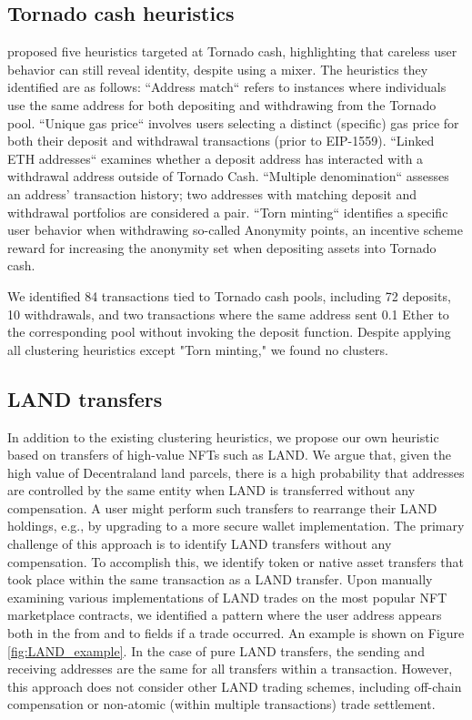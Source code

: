 \documentclass[12pt,a4paper,titlepage,oneside,english]{article}
\begin{document}
\subsection{Tornado cash heuristics}

\cite{wu2022tutela} proposed five heuristics targeted at Tornado cash, highlighting that careless user behavior can still reveal identity, despite using a mixer. The heuristics they identified are as follows: \newline
``Address match`` refers to instances where individuals use the same address for both depositing and withdrawing from the Tornado pool. ``Unique gas price`` involves users selecting a distinct (specific) gas price for both their deposit and withdrawal transactions (prior to EIP-1559). ``Linked ETH addresses`` examines whether a deposit address has interacted with a withdrawal address outside of Tornado Cash. ``Multiple denomination`` assesses an address' transaction history; two addresses with matching deposit and withdrawal portfolios are considered a pair. ``Torn minting`` identifies a specific user behavior when withdrawing so-called Anonymity points, an incentive scheme reward for increasing the anonymity set when depositing assets into Tornado cash.

We identified 84 transactions tied to Tornado cash pools, including 72 deposits, 10 withdrawals, and two transactions where the same address sent 0.1 Ether to the corresponding pool without invoking the deposit function.  Despite applying all clustering heuristics except "Torn minting," we found no clusters.

\subsection{LAND transfers}
In addition to the existing clustering heuristics, we propose our own heuristic based on transfers of high-value NFTs such as LAND. We argue that, given the high value of Decentraland land parcels, there is a high probability that addresses are controlled by the same entity when LAND is transferred without any compensation. A user might perform such transfers to rearrange their LAND holdings, e.g., by upgrading to a more secure wallet implementation. \newline
The primary challenge of this approach is to identify LAND transfers without any compensation. To accomplish this, we identify token or native asset transfers that took place within the same transaction as a LAND transfer. Upon manually examining various implementations of LAND trades on the most popular NFT marketplace contracts, we identified a pattern where the user address appears both in the from and to fields if a trade occurred. An example is shown on Figure \ref{fig:LAND_example}. 
In the case of pure LAND transfers, the sending and receiving addresses are the same for all transfers within a transaction. However, this approach does not consider other LAND trading schemes, including off-chain compensation or non-atomic (within multiple transactions) trade settlement.
\end{document}
